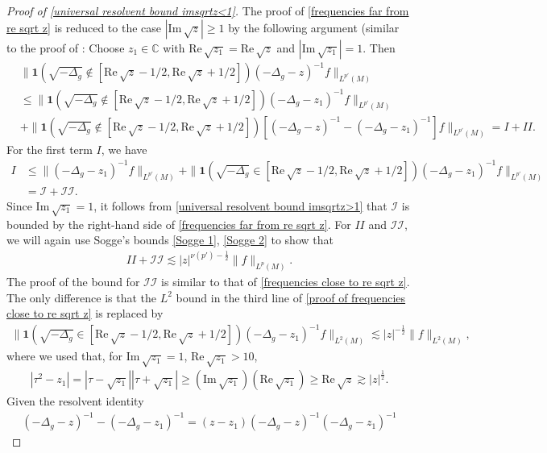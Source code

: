 \documentclass[12pt]{amsart}
\newcommand{\C}{{\mathbb C}}
\newcommand\re{\mathrm{Re}\,}
\newcommand\im{\mathrm{Im}\,}
\begin{document}
\begin{proof}[Proof of \eqref{universal resolvent bound imsqrtz<1}]
The proof of \eqref{frequencies far from re sqrt z} is reduced to the case $|\im\sqrt{z}|\geq 1$ by the following argument (similar to the proof of \cite[(2.33)]{MR3302640}: Choose $z_1\in\C$ with $\re\sqrt{z_1}=\re\sqrt{z}$ and $|\im\sqrt{z_1}|=1$. Then
\begin{align}
& \|\mathbf{1}(\sqrt{-\Delta_g}\notin [\re\sqrt{z}-1/2,\re\sqrt{z}+1/2])(-\Delta_g-z)^{-1}f\|_{L^{p'}(M)}\\
&\leq \|\mathbf{1}(\sqrt{-\Delta_g}\notin [\re\sqrt{z}-1/2,\re\sqrt{z}+1/2])(-\Delta_g-z_1)^{-1}f\|_{L^{p'}(M)}\\
&+\|\mathbf{1}(\sqrt{-\Delta_g}\notin [\re\sqrt{z}-1/2,\re\sqrt{z}+1/2])[(-\Delta_g-z)^{-1}-(-\Delta_g-z_1)^{-1}]f\|_{L^{p'}(M)}=I+II.
\end{align}
For the first term $I$, we have 
\begin{align}
I&\leq \|(-\Delta_g-z_1)^{-1}f\|_{L^{p'}(M)}+\|\mathbf{1}(\sqrt{-\Delta_g}\in [\re\sqrt{z}-1/2,\re\sqrt{z}+1/2])(-\Delta_g-z_1)^{-1}f\|_{L^{p'}(M)}\\
&=\mathcal{I}+\mathcal{II}.
\end{align}
Since $\im\sqrt{z_1}=1$, it follows from \eqref{universal resolvent bound imsqrtz>1} that $\mathcal{I}$ is bounded by the right-hand side of \eqref{frequencies far from re sqrt z}. For $II$ and $\mathcal{II}$, we will again use Sogge's bounds \eqref{Sogge 1}, \eqref{Sogge 2} to show that
\begin{align}\label{II+mathcal II}
    II+\mathcal{II}\lesssim |z|^{\nu(p')-\frac{1}{2}}\|f\|_{L^{p}(M)}.
\end{align}
The proof of the bound for $\mathcal{II}$ is similar to that of \eqref{frequencies close to re sqrt z}. The only difference is that the $L^2$ bound in the third line of \eqref{proof of frequencies close to re sqrt z} is replaced by 
\begin{align}
    \|\mathbf{1}(\sqrt{-\Delta_g}\in [\re\sqrt{z}-1/2,\re\sqrt{z}+1/2])(-\Delta_g-z_1)^{-1}f\|_{L^{2}(M)}\lesssim |z|^{-\frac{1}{2}}\|f\|_{L^{2}(M)},
\end{align}
where we used that, for $\im\sqrt{z_1}=1$, $\re\sqrt{z_1}>10$,
\begin{align}
    |\tau^2-z_1|=|\tau-\sqrt{z_1}||\tau+\sqrt{z_1}|\geq (\im\sqrt{z_1})(\re\sqrt{z_1})\geq \re\sqrt{z}\gtrsim |z|^{\frac{1}{2}}.
\end{align}
Given the resolvent identity
\begin{align}
(-\Delta_g-z)^{-1}-(-\Delta_g-z_1)^{-1}=(z-z_1)(-\Delta_g-z)^{-1}(-\Delta_g-z_1)^{-1}  

\end{align}
\end{proof}
\end{document}
